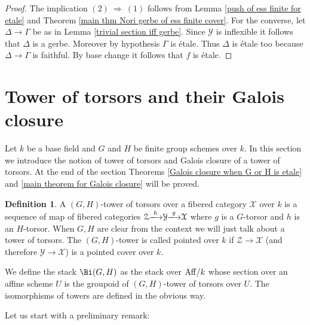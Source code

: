 \documentclass[12pt,reqno]{amsart}
\theoremstyle{plain}
\theoremstyle{definition}
\newtheorem{defn}[thm]{Definition}
\numberwithin{thm}{section}
\newcounter{x}\setcounter{x}{1}
\theoremstyle{plain}
\begin{document}
\begin{proof}
The implication $(2){\ \Longrightarrow\ } (1)$ follows from Lemma \ref{push of ess finite for etale} and Theorem \ref{main thm Nori gerbe of ess finite cover}.
For the converse, let $\Delta{\longrightarrow} \Gamma$ be as in Lemma \ref{trivial section iff gerbe}. Since ${\mathcal{Y}}$ is inflexible it follows that $\Delta$ is a gerbe. Moreover by hypothesis $\Gamma$ is \'etale. Thus $\Delta$ is \'etale too because $\Delta{\longrightarrow}\Gamma$ is faithful. By base change it follows that $f$ is \'etale.
\end{proof}

\section{Tower of torsors and their Galois closure}

Let $k$ be a base field and $G$ and $H$ be finite group schemes over $k$. In this section we 
introduce the notion of tower of torsors and Galois closure of a tower of torsors. At the end of 
the section Theorems \ref{Galois closure when G or H is etale} and \ref{main theorem 
for Galois closure} will be proved.

\begin{defn}
A $(G,H)$-tower of torsors over a fibered category ${\mathcal{X}}$ over $k$ is a sequence 
of map of fibered categories ${\mathcal{Z}}{\xlongrightarrow{h}} {\mathcal{Y}}{\xlongrightarrow{g}} {\mathcal{X}}$ where $g$ is a 
$G$-torsor and $h$ is an $H$-torsor. When $G,H$ are clear from the context we will 
just talk about a tower of torsors. The $(G,H)$-tower is called pointed over $k$ if
${\mathcal{Z}}{\longrightarrow} {\mathcal{X}}$ (and therefore ${\mathcal{Y}}{\longrightarrow} {\mathcal{X}}$) is a pointed cover over $k$.
 
 We define the stack $\Bi(G,H)$ as the stack over ${{\rm Aff}}/k$ whose section over an affine scheme $U$ is the groupoid of $(G,H)$-tower of torsors over $U$. The isomorphisms of towers are defined in the obvious way.
\end{defn}

Let us start with a preliminary remark:
\end{document}
